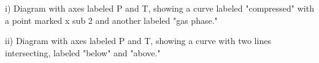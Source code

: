 i) Diagram with axes labeled P and T, showing a curve labeled "compressed" with a point marked x sub 2 and another labeled "gas phase."

ii) Diagram with axes labeled P and T, showing a curve with two lines intersecting, labeled "below" and "above."